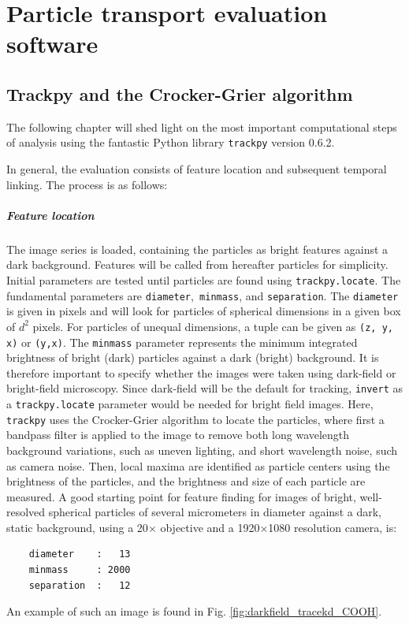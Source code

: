 \chapter{Particle transport evaluation software}
\section{Trackpy and the Crocker-Grier algorithm}
The following chapter will shed light on the most important computational steps of analysis using the fantastic Python library \verb|trackpy| version 0.6.2\cite{Allan2024}.



In general, the evaluation consists of feature location and subsequent temporal linking.
The process is as follows:
\paragraph{Feature location}
The image series is loaded, containing the particles as bright features against a dark background.
Features will be called from hereafter particles for simplicity. 
Initial parameters are tested until particles are found using \verb|trackpy.locate|.
The fundamental parameters are \verb|diameter|,\verb| minmass|, and \verb|separation|. 
The \verb|diameter| is given in pixels and will look for particles of spherical dimensions in a given box of $d^2$ pixels.
For particles of unequal dimensions, a tuple can be given as \verb|(z, y, x)| or \verb|(y,x)|. 
The \verb|minmass| parameter represents the minimum integrated brightness of bright (dark) particles against a dark (bright) background. 
It is therefore important to specify whether the images were taken using dark-field or bright-field microscopy.
Since dark-field will be the default for tracking, \verb|invert| as a \verb|trackpy.locate| parameter would be needed for bright field images.
Here, \verb|trackpy| uses the Crocker-Grier algorithm to locate the particles, where first a bandpass filter is applied to the image to remove both long wavelength background variations, such as uneven lighting, and short wavelength noise, such as camera noise\cite{Crocker1996}.
Then, local maxima are identified as particle centers using the brightness of the particles, and the brightness and size of each particle are measured\cite{Crocker1996}.
A good starting point for feature finding for images of bright, well-resolved spherical particles of several micrometers in diameter against a dark, static background, using a 20$\times$ objective and a 1920$\times$1080 resolution camera, is:  
\begin{verbatim} 
    diameter    :   13
    minmass     : 2000
    separation  :   12
\end{verbatim}
An example of such an image is found in Fig. \ref{fig:darkfield_tracekd_COOH}.

